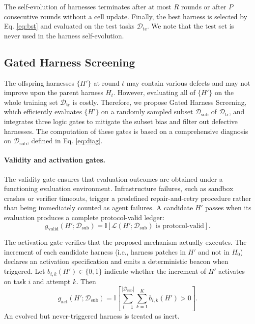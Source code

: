 The self-evolution of harnesses terminates after at most $R$ rounds or after $P$ consecutive rounds without a cell update.
%
Finally, the best harness is selected by Eq. \ref{eq:bst} and evaluated on the test tasks $\mathcal{D}_{\mathrm{te}}$.
%
We note that the test set is never used in the harness self-evolution.
%

\subsection{Gated Harness Screening}
\label{sec:vca}
The offspring harnesses $\{H'\}$ at round $t$ may contain various defects and may not improve upon the parent harness $H_t$.
%
However, evaluating all of $\{H'\}$ on the whole training set $\mathcal{D}_{\mathrm{tr}}$ is costly.
%
Therefore, we propose Gated Harness Screening, which efficiently evaluates $\{H'\}$ on a randomly sampled subset $\mathcal{D}_{\mathrm{sub}}$ of $\mathcal{D}_{\mathrm{tr}}$, and integrates three logic gates to mitigate the subset bias and filter out defective harnesses.
%
The computation of these gates is based on a comprehensive diagnosis on $\mathcal{D}_{\mathrm{sub}}$, defined in Eq. \ref{eq:diag}.

\paragraph{Validity and activation gates.}
The validity gate ensures that evaluation outcomes are obtained under a functioning evaluation environment.
%
Infrastructure failures, such as sandbox crashes or verifier timeouts, trigger a predefined repair-and-retry procedure rather than being immediately counted as agent failures.
%
A candidate $H'$ passes when its evaluation produces a complete protocol-valid ledger:
\begin{equation}
g_{\mathrm{valid}}(H';\mathcal{D}_{\mathrm{sub}})
=
\mathbb{I}
\left[
\mathcal{L}(H';\mathcal{D}_{\mathrm{sub}})
\text{ is protocol-valid}
\right].
\end{equation}

The activation gate verifies that the proposed mechanism actually executes.
%
The increment of each candidate harness (i.e., harness patches in $H'$ and not in $H_0$) declares an activation specification and emits a deterministic beacon when triggered.
%
Let $b_{i,k}(H')\in\{0,1\}$ indicate whether the increment of $H'$ activates on task $i$ and attempt $k$.
%
Then
\begin{equation}
g_{\mathrm{act}}(H';\mathcal{D}_{\mathrm{sub}})
=
\mathbb{I}
\left[
\sum_{i=1}^{|\mathcal{D}_{\mathrm{sub}}|}
\sum_{k=1}^{K}b_{i,k}(H')>0
\right].
\end{equation}
%
An evolved but never-triggered harness is treated as inert.
%

